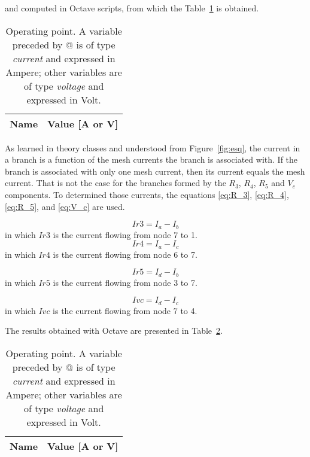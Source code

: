 and computed in Octave scripts, from which the Table~\ref{tab:op1} is obtained.

\begin{table}[h]
  \centering
  \begin{tabular}{|l|r|}
    \hline    
    {\bf Name} & {\bf Value [A or V]} \\ \hline
    
  \end{tabular}
  \caption{Operating point. A variable preceded by @ is of type {\em current}
    and expressed in Ampere; other variables are of type {\it voltage} and expressed in
    Volt.}
  \label{tab:op1}
\end{table}

As learned in theory classes and understood from Figure~\ref{fig:esq}, the current in a branch is a function of the mesh currents the branch is associated with. If the branch is associated with only one mesh current, then its current equals the mesh current. That is not the case for the branches formed by the $R_3$, $R_4$, $R_5$ and $V_c$ components. To determined those currents, the equations \ref{eq:R_3}, \ref{eq:R_4}, \ref{eq:R_5}, and \ref{eq:V_c} are used.

\begin{equation}
  Ir3=I_a-I_b
  \label{eq:R_3}
\end{equation}
in which $Ir3$ is the current flowing from node 7 to 1.
\begin{equation}
  Ir4=I_a-I_c
  \label{eq:R_4}
\end{equation}
in which $Ir4$ is the current flowing from node 6 to 7.

\begin{equation}
  Ir5=I_d-I_b
  \label{eq:R_5}
\end{equation}
in which $Ir5$ is the current flowing from node 3 to 7.

\begin{equation}
  Ivc=I_d-I_c
  \label{eq:V_c}
\end{equation}
in which $Ivc$ is the current flowing from node 7 to 4.

The results obtained with Octave are presented in Table~\ref{tab:op2}.

\begin{table}[h]
  \centering
  \begin{tabular}{|l|r|}
    \hline    
    {\bf Name} & {\bf Value [A or V]} \\ \hline
    
  \end{tabular}
  \caption{Operating point. A variable preceded by @ is of type {\em current}
    and expressed in Ampere; other variables are of type {\it voltage} and expressed in
    Volt.}
  \label{tab:op2}
\end{table}



